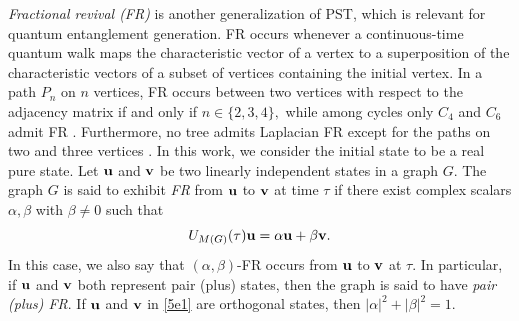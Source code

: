 \documentclass[12pt,a4paper]{article}
\def \e {{\bf e}}
\def \u {{\bf u}}
\def \v {{\bf v}}
\def \e {{\mathbf e}}
\begin{document}
\emph{Fractional revival (FR)} is another generalization of PST, which is relevant for quantum entanglement generation. FR occurs whenever a continuous-time quantum walk maps
the characteristic vector of a vertex to a superposition of the characteristic vectors of a
subset of vertices containing the initial vertex.
 In a path $P_n$ on $n$ vertices, FR occurs between two vertices with respect to the adjacency matrix if and only if $n\in\{2,3,4\},$ while among cycles only $C_4$ and $C_6$ admit FR \cite{chan2}. Furthermore, no tree admits Laplacian FR except for the paths on two
and three vertices \cite{chan3}.
In this work, we consider the initial state to be a real pure state. Let 
$\u$ and $\v$ be two linearly independent states in a graph $G.$ The graph $G$ is said to exhibit \emph{FR} from $\u$ to $\v$
 at time $\tau$ if there exist complex scalars $\alpha,\beta$ with $\beta\neq 0$
such that
\begin{equation}\label{5e1}
U_{M(G)}(\tau)\u=\alpha\u+\beta\v.
\end{equation}
In this case, we also say that $(\alpha,\beta)$-FR occurs from $\u$ to $\v$ at $\tau.$ 
In particular, if $\u$ and $\v$ both represent pair (plus) states, then the graph is said to have \textit{pair (plus) FR}. If $\u$ and $\v$ in \eqref{5e1} are orthogonal states, then $|\alpha|^2+|\beta|^2=1.$
\end{document}
